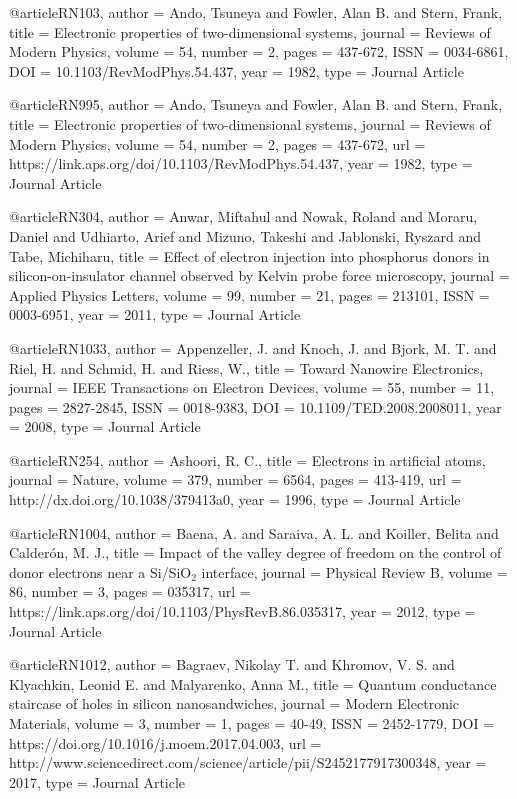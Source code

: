 @article{RN103,
   author = {Ando, Tsuneya and Fowler, Alan B. and Stern, Frank},
   title = {Electronic properties of two-dimensional systems},
   journal = {Reviews of Modern Physics},
   volume = {54},
   number = {2},
   pages = {437-672},
   ISSN = {0034-6861},
   DOI = {10.1103/RevModPhys.54.437},
   year = {1982},
   type = {Journal Article}
}

@article{RN995,
   author = {Ando, Tsuneya and Fowler, Alan B. and Stern, Frank},
   title = {Electronic properties of two-dimensional systems},
   journal = {Reviews of Modern Physics},
   volume = {54},
   number = {2},
   pages = {437-672},
   url = {https://link.aps.org/doi/10.1103/RevModPhys.54.437},
   year = {1982},
   type = {Journal Article}
}

@article{RN304,
   author = {Anwar, Miftahul and Nowak, Roland and Moraru, Daniel and Udhiarto, Arief and Mizuno, Takeshi and Jablonski, Ryszard and Tabe, Michiharu},
   title = {Effect of electron injection into phosphorus donors in silicon-on-insulator channel observed by Kelvin probe force microscopy},
   journal = {Applied Physics Letters},
   volume = {99},
   number = {21},
   pages = {213101},
   ISSN = {0003-6951},
   year = {2011},
   type = {Journal Article}
}

@article{RN1033,
   author = {Appenzeller, J. and Knoch, J. and Bjork, M. T. and Riel, H. and Schmid, H. and Riess, W.},
   title = {Toward Nanowire Electronics},
   journal = {IEEE Transactions on Electron Devices},
   volume = {55},
   number = {11},
   pages = {2827-2845},
   ISSN = {0018-9383},
   DOI = {10.1109/TED.2008.2008011},
   year = {2008},
   type = {Journal Article}
}

@article{RN254,
   author = {Ashoori, R. C.},
   title = {Electrons in artificial atoms},
   journal = {Nature},
   volume = {379},
   number = {6564},
   pages = {413-419},
   url = {http://dx.doi.org/10.1038/379413a0},
   year = {1996},
   type = {Journal Article}
}

@article{RN1004,
   author = {Baena, A. and Saraiva, A. L. and Koiller, Belita and Calderón, M. J.},
   title = {Impact of the valley degree of freedom on the control of donor electrons near a Si/SiO${}_{2}$ interface},
   journal = {Physical Review B},
   volume = {86},
   number = {3},
   pages = {035317},
   url = {https://link.aps.org/doi/10.1103/PhysRevB.86.035317},
   year = {2012},
   type = {Journal Article}
}

@article{RN1012,
   author = {Bagraev, Nikolay T. and Khromov, V. S. and Klyachkin, Leonid E. and Malyarenko, Anna M.},
   title = {Quantum conductance staircase of holes in silicon nanosandwiches},
   journal = {Modern Electronic Materials},
   volume = {3},
   number = {1},
   pages = {40-49},
   ISSN = {2452-1779},
   DOI = {https://doi.org/10.1016/j.moem.2017.04.003},
   url = {http://www.sciencedirect.com/science/article/pii/S2452177917300348},
   year = {2017},
   type = {Journal Article}
}

